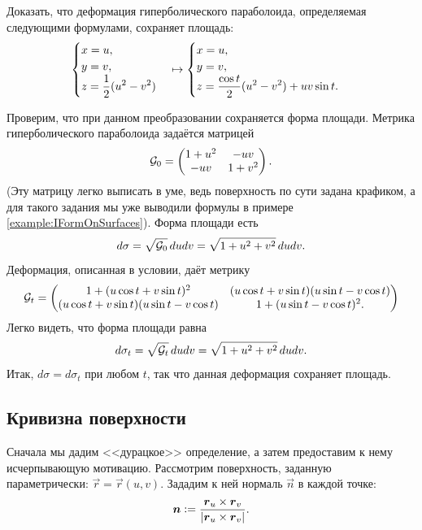 \begin{problem}
	Доказать, что деформация гиперболического параболоида, определяемая следующими формулами, сохраняет площадь:
	\[
		\begin{cases}
			x = u,\\
			y = v,\\
			\displaystyle z = \frac{1}{2}(u^2 - v^2)
		\end{cases}
		\mapsto
		\begin{cases}
			x = u,\\
			y = v,\\
			\displaystyle z = \frac{\cos t}{2}(u^2 - v^2) + uv\sin t.
		\end{cases}
	\]
\end{problem}

\begin{solution}
	Проверим, что при данном преобразовании сохраняется форма площади. Метрика гиперболического параболоида задаётся матрицей
	\[
		\mathcal{G}_0 =
		\begin{pmatrix}
			1 + u^2 & -uv\\
			-uv & 1 + v^2
		\end{pmatrix}.
	\]
	(Эту матрицу легко выписать в уме, ведь поверхность по сути задана крафиком, а для такого задания мы уже выводили формулы в примере \ref{example:IFormOnSurfaces}). Форма площади есть
	\[
		d\sigma = \sqrt{\mathcal{G}_0}\,dudv = \sqrt{1 + u^2 + v^2}\,dudv.
	\]
	Деформация, описанная в условии, даёт метрику
	\[
		\mathcal{G}_t =
		\begin{pmatrix}
			1 + (u\cos t + v\sin t)^2 & (u\cos t + v\sin t)(u\sin t - v\cos t)\\
			(u\cos t + v\sin t)(u\sin t - v\cos t) & 1 + (u\sin t - v\cos t)^2.
		\end{pmatrix}
	\]
	Легко видеть, что форма площади равна
	\[
		d\sigma_t = \sqrt{\mathcal{G}_t}\,dudv = \sqrt{1 + u^2 + v^2}\,dudv.
	\]
	Итак, $d\sigma = d\sigma_t$ при любом $t$, так что данная деформация сохраняет площадь.
\end{solution}


\subsection{Кривизна поверхности}

Сначала мы дадим <<дурацкое>> определение, а затем предоставим к нему исчерпывающую мотивацию. Рассмотрим поверхность, заданную параметрически: $\vec{r} = \vec{r}(u, v)$. Зададим к ней нормаль $\vec{n}$ в каждой точке:
\[
	\boldsymbol{n} \vcentcolon = \frac{\boldsymbol{r}_u \times \boldsymbol{r}_v}{\left\lvert\boldsymbol{r}_u \times \boldsymbol{r}_v\right\rvert}.
\]


